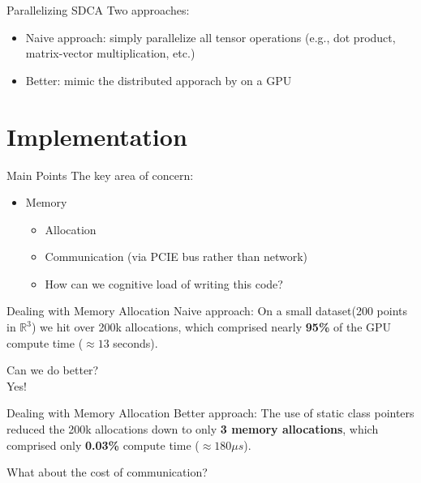 \documentclass{beamer}
\begin{document}
\begin{frame}{Parallelizing SDCA}
  Two approaches:
	\begin{itemize}
    \item Naive approach: simply parallelize all tensor operations (e.g., dot
      product, matrix-vector multiplication, etc.) \pause
  \item Better: mimic the distributed apporach by \cite{yang2013trading} on a GPU
	\end{itemize}
\end{frame}
\section{Implementation}
\begin{frame}{Main Points}
  The key area of concern:
  \begin{itemize}
    \item Memory
      \begin{itemize}
        \item Allocation \pause
        \item Communication (via PCIE bus rather than network) \pause
        \item How can we cognitive load of writing this code?
      \end{itemize}
  \end{itemize}
\end{frame}

\begin{frame}{Dealing with Memory Allocation}
  Naive approach:
  On a small dataset(200 points in $\mathbb{R}^3$) we hit over 200k allocations,
  which comprised nearly \textbf{95\%} of the GPU compute time ($\approx 13$
    seconds).
\end{frame}

\begin{frame}[standout]
  Can we do better?\\ \pause
  Yes!
\end{frame}


\begin{frame}{Dealing with Memory Allocation}
  Better approach:
  The use of static class pointers reduced the 200k allocations down to only
  \textbf{3 memory allocations}, which comprised only \textbf{0.03\%} compute
    time ($\approx 180 \mu s$).
\end{frame}

\begin{frame}[standout]
  What about the cost of communication?
\end{frame}
\end{document}
